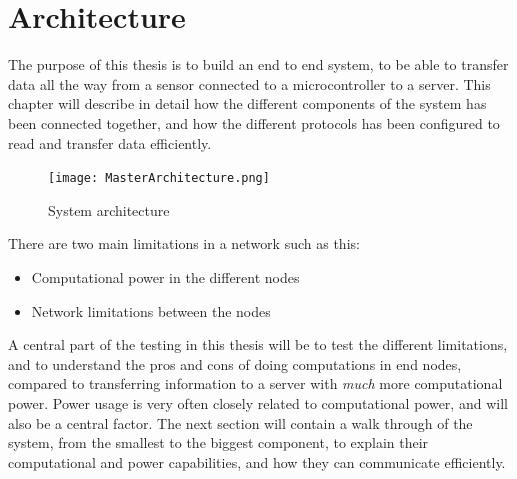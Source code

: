 \chapter{Architecture}
\label{chp:architecture} 

The purpose of this thesis is to build an end to end system, to be able to transfer data all the way from a sensor connected to a microcontroller to a server. This chapter will describe in detail how the different components of the system has been connected together, and how the different protocols has been configured to read and transfer data efficiently. 


\begin{figure}[h]
    \centering
    \texttt{[image: MasterArchitecture.png]}    \caption{System architecture}
    \label{fig:systemArchitecture}
\end{figure}

\newpage

There are two main limitations in a network such as this:

\begin{itemize}
  \item Computational power in the different nodes 
  \item Network limitations between the nodes
\end{itemize}

A central part of the testing in this thesis will be to test the different limitations, and to understand the pros and cons of doing computations in end nodes, compared to transferring information to a server with \textit{much} more computational power. Power usage is very often closely related to computational power, and will also be a central factor. The next section will contain a walk through of the system, from the smallest to the biggest component, to explain their computational and power capabilities, and how they can communicate efficiently. 




